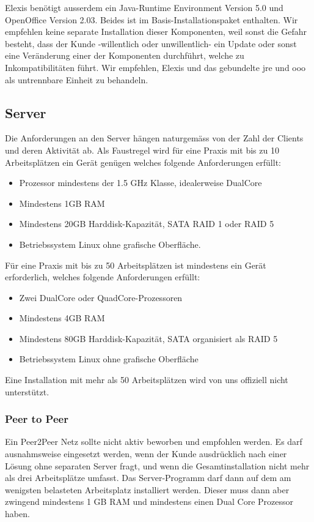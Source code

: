\documentclass[paper=a4,BCOR8.25mm,twoside]{scrartcl}
\begin{document}
\bigskip
Elexis benötigt ausserdem ein Java-Runtime Environment Version 5.0 und OpenOffice Version 2.03. Beides ist im Basis-Installationspaket enthalten. Wir empfehlen keine separate Installation dieser Komponenten, weil sonst die Gefahr besteht, dass der Kunde -willentlich oder unwillentlich- ein Update oder sonst eine Veränderung einer der Komponenten durchführt, welche zu Inkompatibilitäten führt. Wir empfehlen, Elexis und das gebundelte jre und ooo als untrennbare Einheit zu behandeln.

\subsection{Server}
Die Anforderungen an den Server hängen naturgemäss von der Zahl der Clients und deren Aktivität ab. Als Faustregel wird für eine Praxis mit bis zu 10 Arbeitsplätzen ein Gerät genügen welches folgende Anforderungen erfüllt:
\begin{itemize}
    \item Prozessor mindestens der 1.5 GHz Klasse, idealerweise DualCore
    \item Mindestens 1GB RAM
    \item Mindestens 20GB Harddisk-Kapazität, SATA RAID 1 oder RAID 5
    \item Betriebssystem Linux ohne grafische Oberfläche.
\end{itemize}

Für eine Praxis mit bis zu 50 Arbeitsplätzen ist mindestens ein Gerät erforderlich, welches folgende Anforderungen erfüllt:
\begin{itemize}
    \item Zwei DualCore oder QuadCore-Prozessoren
    \item Mindestens 4GB RAM
    \item Mindestens 80GB Harddisk-Kapazität, SATA organisiert als RAID 5
    \item Betriebssystem Linux ohne grafische Oberfläche
\end{itemize}

Eine Installation mit mehr als 50 Arbeitsplätzen wird von uns offiziell nicht unterstützt.

\subsubsection{Peer to Peer}
Ein Peer2Peer Netz sollte nicht aktiv beworben und empfohlen werden. Es darf ausnahmsweise eingesetzt werden, wenn der Kunde ausdrücklich nach einer Lösung ohne separaten Server fragt, und wenn die Gesamtinstallation nicht mehr als drei Arbeitsplätze umfasst. Das Server-Programm darf dann auf dem am wenigsten belasteten Arbeitsplatz installiert werden. Dieser muss dann aber zwingend mindestens 1 GB RAM und mindestens einen Dual Core Prozessor haben.
\end{document}
